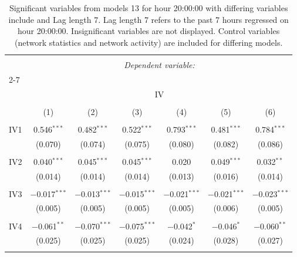 
\begin{table}[!htbp] \centering 
  \caption{Significant variables from models 13 for hour 20:00:00 with differing variables include 
                               and Lag length 7. Lag length 7 refers to the past 7 hours regressed on hour 20:00:00. 
                               Insignificant variables are not displayed. 
                               Control variables (network statistics and network activity) are 
                               included for differing models.} 
  \label{IVmodels1_t_hourlagged7} 
\scriptsize 
\begin{tabular}{@{\extracolsep{5pt}}lcccccc} 
\\[-1.8ex]\hline 
\hline \\[-1.8ex] 
 & \multicolumn{6}{c}{\textit{Dependent variable:}} \\ 
\cline{2-7} 
\\[-1.8ex] & \multicolumn{6}{c}{IV} \\ 
\\[-1.8ex] & (1) & (2) & (3) & (4) & (5) & (6)\\ 
\hline \\[-1.8ex] 
 IV1 & 0.546$^{***}$ & 0.482$^{***}$ & 0.522$^{***}$ & 0.793$^{***}$ & 0.481$^{***}$ & 0.784$^{***}$ \\ 
  & (0.070) & (0.074) & (0.075) & (0.080) & (0.082) & (0.086) \\ 
  & & & & & & \\ 
 IV2 & 0.040$^{***}$ & 0.045$^{***}$ & 0.045$^{***}$ & 0.020 & 0.049$^{***}$ & 0.032$^{**}$ \\ 
  & (0.014) & (0.014) & (0.014) & (0.013) & (0.016) & (0.014) \\ 
  & & & & & & \\ 
 IV3 & $-$0.017$^{***}$ & $-$0.013$^{***}$ & $-$0.015$^{***}$ & $-$0.021$^{***}$ & $-$0.021$^{***}$ & $-$0.023$^{***}$ \\ 
  & (0.005) & (0.005) & (0.005) & (0.005) & (0.006) & (0.005) \\ 
  & & & & & & \\ 
 IV4 & $-$0.061$^{**}$ & $-$0.070$^{***}$ & $-$0.075$^{***}$ & $-$0.042$^{*}$ & $-$0.046$^{*}$ & $-$0.060$^{**}$ \\ 
  & (0.025) & (0.025) & (0.025) & (0.024) & (0.028) & (0.027) \\ 
  & & & & & & \\ 

\end{tabular}
\end{table}
